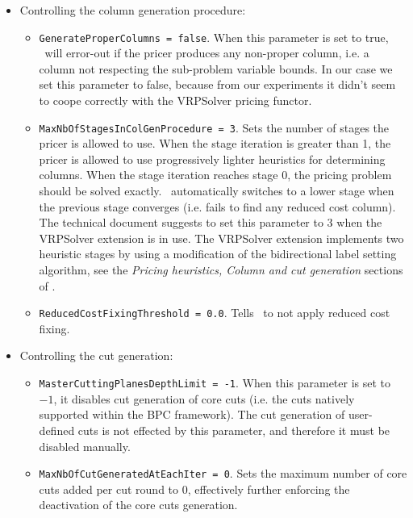 \begin{itemize}
	\item Controlling the column generation procedure:
	      \begin{itemize}
		      \item \texttt{GenerateProperColumns = false}.
		            When this parameter is set to true, \bapcod\ will error-out if the pricer produces any non-proper column,
		            i.e. a column not respecting the sub-problem variable bounds.
		            In our case we set this parameter to false, because from our experiments it didn't seem to coope correctly with the VRPSolver pricing functor.
		      \item \texttt{MaxNbOfStagesInColGenProcedure = 3}.
		            Sets the number of stages the pricer is allowed to use.
		            When the stage iteration is greater than 1, the pricer is allowed to use
		            progressively lighter heuristics for determining columns.
		            When the stage iteration reaches stage 0, the pricing problem should be solved exactly.
		            \bapcod\ automatically switches to a lower stage when the previous stage converges (i.e. fails to find any reduced cost column).
		            The technical document suggests to set this parameter to $3$ when the VRPSolver extension is in use.
		            The VRPSolver extension implements two heuristic stages by using a modification of the bidirectional label setting algorithm, see the \textit{Pricing heuristics, Column and cut generation} sections of \textcite{sadykov2021a}.
		      \item \texttt{ReducedCostFixingThreshold = 0.0}.
		            Tells \bapcod\ to not apply reduced cost fixing.
	      \end{itemize}

	\item Controlling the cut generation:
	      \begin{itemize}
		      \item \texttt{MasterCuttingPlanesDepthLimit = -1}.
		            When this parameter is set to $-1$, it disables cut generation of core cuts
		            (i.e. the cuts natively supported within the BPC framework).
		            The cut generation of user-defined cuts
		            is not effected by this parameter, and therefore it must be disabled manually.
		      \item \texttt{MaxNbOfCutGeneratedAtEachIter = 0}.
		            Sets the maximum number of core cuts added per cut round to $0$,
		            effectively further enforcing the deactivation of the core cuts generation.
	      \end{itemize}


\end{itemize}
